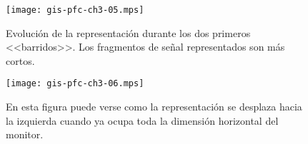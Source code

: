 \begin{figure}
	\begin{center}
		\texttt{[image: gis-pfc-ch3-05.mps]}
	\end{center}
	\caption[Evolución de la representación]{Evolución de la
	representación durante los dos primeros <<barridos>>. Los
	fragmentos de señal representados son más cortos.}
	\label{fig:firmodcont}
\end{figure}

\begin{figure}
	\begin{center}
		\texttt{[image: gis-pfc-ch3-06.mps]}
	\end{center}
	\caption[Desplazamiento de la representación]{En esta figura puede
	verse como la representación se desplaza hacia la izquierda cuando
	ya ocupa toda la dimensión horizontal del monitor.}
	\label{fig:desmodcont}
\end{figure}
